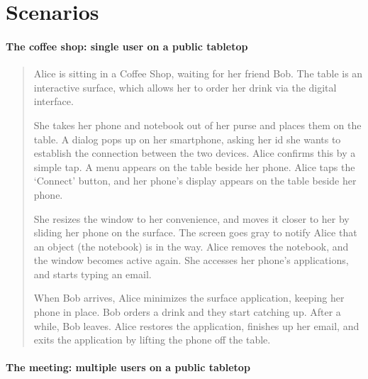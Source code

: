 \appendix
\chapter{Scenarios}
\label{scenarios}

\subsubsection*{The coffee shop: single user on a public tabletop}

\begin{quotation}
\small{
Alice is sitting in a Coffee Shop, waiting for her friend Bob.
The table is an interactive surface, which allows her to order her drink via the digital interface.

She takes her phone and notebook out of her purse and places them on the table. 
A dialog pops up on her smartphone, asking her id she wants to establish the connection between the two devices.
Alice confirms this by a simple tap.
A menu appears on the table beside her phone. 
Alice taps the `Connect' button, and her phone's display appears on the table beside her phone.

She resizes the window to her convenience, and moves it closer to her by sliding her phone on the surface. 
The screen goes gray to notify Alice that an object (the notebook) is in the way. 
Alice removes the notebook, and the window becomes active again. 
She accesses her phone's applications, and starts typing an email.

When Bob arrives, Alice minimizes the surface application, keeping her phone in place. 
Bob orders a drink and they start catching up. 
After a while, Bob leaves. 
Alice restores the application, finishes up her email, and exits the application by lifting the phone off the table.}
\end{quotation}

\subsubsection*{The meeting: multiple users on a public tabletop}

